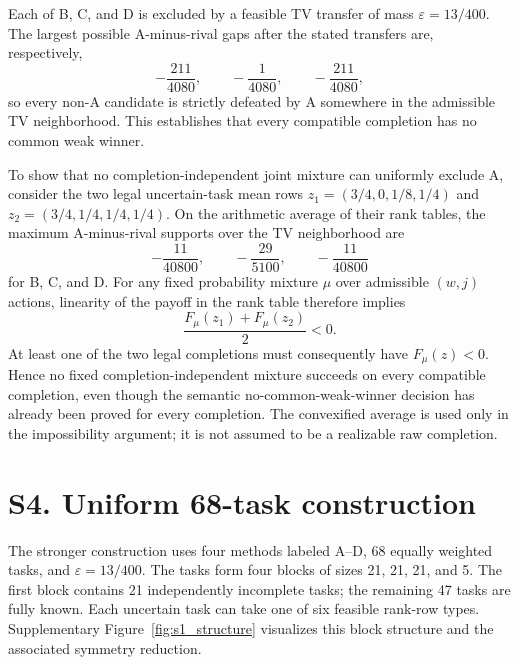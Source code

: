 \documentclass[11pt]{article}
\begin{document}
Each of B, C, and D is excluded by a feasible TV transfer of mass $\varepsilon=13/400$. The largest possible A-minus-rival gaps after the stated transfers are, respectively,
\begin{equation}\label{eq:s_nonA_gaps}
-\frac{211}{4080},\qquad -\frac{1}{4080},\qquad -\frac{211}{4080},
\end{equation}
so every non-A candidate is strictly defeated by A somewhere in the admissible TV neighborhood. This establishes that every compatible completion has no common weak winner.

To show that no completion-independent joint mixture can uniformly exclude A, consider the two legal uncertain-task mean rows $z_1=(3/4,0,1/8,1/4)$ and $z_2=(3/4,1/4,1/4,1/4)$. On the arithmetic average of their rank tables, the maximum A-minus-rival supports over the TV neighborhood are
\begin{equation}\label{eq:s_convex_supports}
-\frac{11}{40800},\qquad -\frac{29}{5100},\qquad -\frac{11}{40800}
\end{equation}
for B, C, and D. For any fixed probability mixture $\mu$ over admissible $(w,j)$ actions, linearity of the payoff in the rank table therefore implies
\begin{equation}\label{eq:s_mixture}
\frac{F_\mu(z_1)+F_\mu(z_2)}2<0.
\end{equation}
At least one of the two legal completions must consequently have $F_\mu(z)<0$. Hence no fixed completion-independent mixture succeeds on every compatible completion, even though the semantic no-common-weak-winner decision has already been proved for every completion. The convexified average is used only in the impossibility argument; it is not assumed to be a realizable raw completion.

\section*{S4. Uniform 68-task construction}
The stronger construction uses four methods labeled A--D, 68 equally weighted tasks, and $\varepsilon=13/400$. The tasks form four blocks of sizes 21, 21, 21, and 5. The first block contains 21 independently incomplete tasks; the remaining 47 tasks are fully known. Each uncertain task can take one of six feasible rank-row types. Supplementary Figure~\ref{fig:s1_structure} visualizes this block structure and the associated symmetry reduction.
\end{document}
